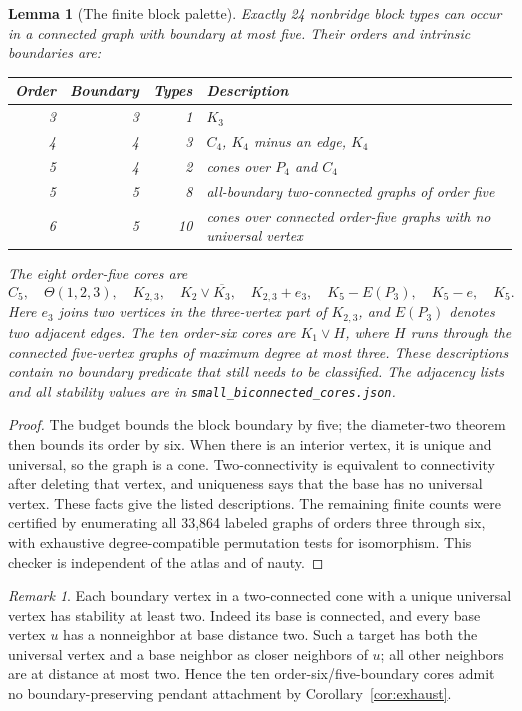\documentclass[11pt,a4paper]{article}
\newtheorem{lemma}[theorem]{Lemma}
\theoremstyle{definition}\newtheorem{definition}[theorem]{Definition}
\theoremstyle{remark}\newtheorem{remark}[theorem]{Remark}
\begin{document}
\begin{lemma}[The finite block palette]\label{lem:palette}
Exactly 24 nonbridge block types can occur in a connected graph with
boundary at most five. Their orders and intrinsic boundaries are:
\begin{center}
\begin{tabular}{@{}rrrl@{}}\toprule
Order & Boundary & Types & Description\\\midrule
3 & 3 & 1 & $K_3$\\
4 & 4 & 3 & $C_4$, $K_4$ minus an edge, $K_4$\\
5 & 4 & 2 & cones over $P_4$ and $C_4$\\
5 & 5 & 8 & all-boundary two-connected graphs of order five\\
6 & 5 & 10 & cones over connected order-five graphs with no universal vertex\\\bottomrule
\end{tabular}
\end{center}
The eight order-five cores are
\[
 C_5,\quad \Theta(1,2,3),\quad K_{2,3},\quad
 K_2\vee\overline{K_3},\quad K_{2,3}+e_3,\quad
 K_5-E(P_3),\quad K_5-e,\quad K_5.
\]
Here $e_3$ joins two vertices in the three-vertex part of $K_{2,3}$,
and $E(P_3)$ denotes two adjacent edges. The ten order-six cores are
$K_1\vee H$, where $H$ runs through the connected five-vertex graphs
of maximum degree at most three. These descriptions contain no boundary
predicate that still needs to be classified. The adjacency lists and
all stability values are in \texttt{small\_biconnected\_cores.json}.
\end{lemma}
\begin{proof}
The budget bounds the block boundary by five; the diameter-two theorem then
bounds its order by six. When there is an interior vertex, it is unique and
universal, so the graph is a cone. Two-connectivity is equivalent to connectivity
after deleting that vertex, and uniqueness says that the base has no universal
vertex. These facts give the listed descriptions. The remaining finite counts
were certified by enumerating all 33,864 labeled graphs of orders three through
six, with exhaustive degree-compatible permutation tests for isomorphism. This
checker is independent of the atlas and of nauty.
\end{proof}

\begin{remark}
Each boundary vertex in a two-connected cone with a unique universal vertex
has stability at least two. Indeed its base is connected, and every base vertex
$u$ has a nonneighbor at base distance two. Such a target has both the universal
vertex and a base neighbor as closer neighbors of $u$; all other neighbors are
at distance at most two. Hence the ten order-six/five-boundary cores admit no
boundary-preserving pendant attachment by Corollary~\ref{cor:exhaust}.
\end{remark}
\end{document}
